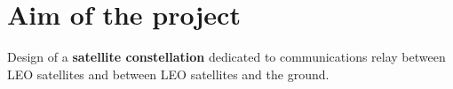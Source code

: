 \chapter{Aim of the project}
Design of a \textbf{satellite constellation} dedicated to  communications relay between LEO satellites and between LEO satellites and the ground. 
